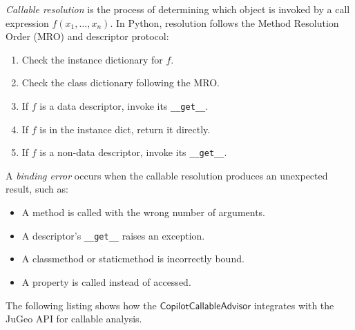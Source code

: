 \documentclass[11pt]{article}
\newcommand{\CallAdv}{\mathsf{CopilotCallableAdvisor}}
\begin{document}
\begin{definition}
\label{def:callable-resolution}
\emph{Callable resolution} is the process of determining which
object is invoked by a call expression $f(x_1, \ldots, x_n)$.
In Python, resolution follows the Method Resolution Order (MRO)
and descriptor protocol:
\begin{enumerate}
\item Check the instance dictionary for $f$.
\item Check the class dictionary following the MRO.
\item If $f$ is a data descriptor, invoke its \texttt{\_\_get\_\_}.
\item If $f$ is in the instance dict, return it directly.
\item If $f$ is a non-data descriptor, invoke its \texttt{\_\_get\_\_}.
\end{enumerate}
\end{definition}

\begin{definition}
\label{def:binding-error}
A \emph{binding error} occurs when the callable resolution
produces an unexpected result, such as:
\begin{itemize}[leftmargin=2em]
\item A method is called with the wrong number of arguments.
\item A descriptor's \texttt{\_\_get\_\_} raises an exception.
\item A classmethod or staticmethod is incorrectly bound.
\item A property is called instead of accessed.
\end{itemize}
\end{definition}

The following listing shows how the $\CallAdv$ integrates with
the JuGeo API for callable analysis.
\end{document}
